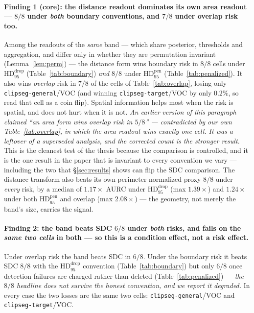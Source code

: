 \documentclass[11pt]{article}
\theoremstyle{remark}
\newcommand{\HDF}{\mathrm{HD}_{95}}
\begin{document}
\paragraph{Finding 1 (core): the distance readout dominates its own area readout ---
$8/8$ under \emph{both} boundary conventions, and $7/8$ under overlap risk too.} Among
the readouts of the \emph{same} band
--- which share posterior, thresholds and aggregation, and differ only in whether
they are permutation invariant (Lemma~\ref{lem:perm}) --- the distance form wins
boundary risk in \textbf{$8/8$} cells under $\HDF^{\mathrm{drop}}$
(Table~\ref{tab:boundary}) \emph{and} $8/8$ under $\HDF^{\mathrm{pen}}$
(Table~\ref{tab:penalized}). It also wins \emph{overlap} risk in $7/8$ of the cells of
Table~\ref{tab:overlap}, losing only \texttt{clipseg-general}/VOC (and winning
\texttt{clipseg-target}/VOC by only $0.2\%$, so read that cell as a coin flip). Spatial
information helps most when the risk is spatial, and does not hurt when it is not.
\emph{An earlier version of this paragraph claimed ``an area form wins overlap risk in
$5/8$'' --- contradicted by our own Table~\ref{tab:overlap}, in which the area readout
wins exactly one cell. It was a leftover of a superseded analysis, and the corrected
count is the stronger result.} This is the cleanest test of the
thesis because the comparison is controlled, and it is the one result in the paper
that is invariant to every convention we vary --- including the two that
\S\ref{sec:results} shows can flip the SDC comparison. The distance transform also
beats its own perimeter-normalized proxy $8/8$ under \emph{every} risk, by a median
of $1.17\times$ AURC under $\HDF^{\mathrm{drop}}$ (max $1.39\times$) and
$1.24\times$ under both $\HDF^{\mathrm{pen}}$ and overlap (max $2.08\times$) --- the
geometry, not merely the band's size, carries the signal.

\paragraph{Finding 2: the band beats SDC $6/8$ under \emph{both} risks, and fails on
the \emph{same two cells} in both --- so this is a condition effect, not a risk
effect.} Under overlap risk the band beats SDC in $6/8$. Under the boundary risk it
beats SDC $8/8$ with the $\HDF^{\mathrm{drop}}$ convention
(Table~\ref{tab:boundary}) but only \textbf{$6/8$} once detection failures are
charged rather than deleted (Table~\ref{tab:penalized}) --- \emph{the $8/8$ headline
does not survive the honest convention, and we report it degraded.} In every case
the two losses are the same two cells: \texttt{clipseg-general}/VOC and
\texttt{clipseg-target}/VOC.
\end{document}
